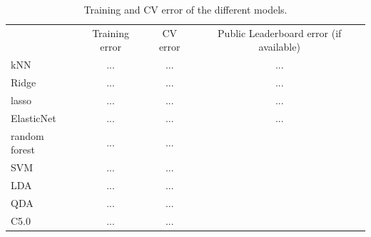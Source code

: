 \documentclass[
]{article}
\begin{document}
\begin{table} 
\begin{center}
\begin{tabular}{|l|c|c|c|} \hline
& Training error & CV error & Public Leaderboard error (if available)\\
  kNN & ... & ... & ...\\
  Ridge & ... & ... & ...\\
  lasso & ... & ... & ...\\
  ElasticNet & ... & ... & ... \\
  random forest & ... & ... \\
  SVM & ... & ... \\
  LDA & ... & ... \\
  QDA & ... & ... \\
  C5.0 & ... & ... \\
  
\hline
\end{tabular}
\end{center}
\caption{Training and CV error of the different models.} \label{tab_res}
\end{table}
\end{document}
